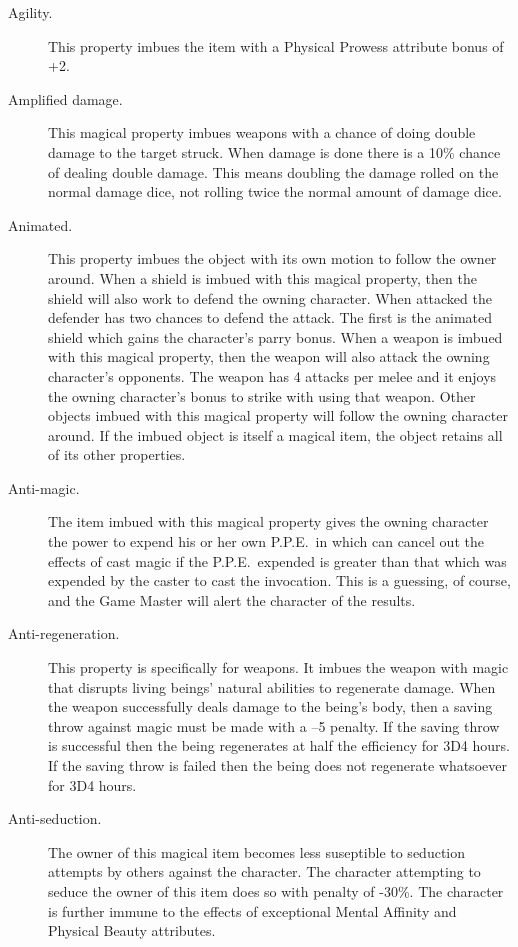 \begin{description}
\item[Agility.] This property imbues the item with a Physical Prowess attribute bonus of +2.

\item[Amplified damage.]
This magical
property imbues
weapons with a chance of doing double damage to the target struck.
When damage is done there is a 10\% chance of dealing double damage.
This means doubling the damage rolled on the normal damage dice, not rolling twice the
normal amount of damage dice.

\item[Animated.]
This property imbues the object with its own
motion to follow the owner around.
When a shield is imbued with this magical
property, then the shield will also work to
defend the owning character.
When attacked the defender has two chances
to defend the attack. The first is the
animated shield which gains the character's
parry bonus.
When a weapon is imbued with this magical
property,
then the weapon will also attack the
owning character's opponents.
The weapon has 4 attacks per melee and it 
enjoys the owning character's bonus to
strike with using that weapon.
Other objects imbued with this magical
property will follow the owning character
around.
If the imbued object is itself a magical
item, the object retains all of its other
properties.

\item[Anti-magic.] The item imbued with this
magical property gives the owning character
the power to expend his or her own P.P.E.\ in
which can cancel out the effects of cast magic
if the P.P.E.\ expended is greater than that which was
expended by the caster to cast the invocation.
This is a guessing, of course, and the Game
Master will alert the
character of the results.

\item[Anti-regeneration.]
This property is specifically for weapons.
It imbues the weapon with magic that disrupts living beings' natural abilities to
regenerate damage.
When the weapon successfully deals damage to the being's body,
then a saving throw against magic must be made with a --5 penalty.
If the saving throw is successful then the being regenerates at
half the efficiency for 3D4 hours.
If the saving throw is failed then the being does not regenerate whatsoever
for 3D4 hours.

\item[Anti-seduction.]
The owner of this magical item becomes
less suseptible to seduction attempts
by others against the character.
The character attempting to seduce
the owner of this item does so with
penalty of -30\%.
The character is further immune to
the effects of exceptional
Mental Affinity and Physical Beauty
attributes.


\end{description}
